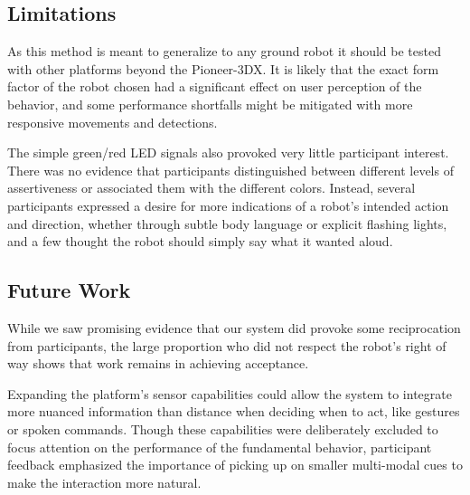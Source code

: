 \documentclass[letterpaper, 10 pt, conference]{ieeeconf}  %
\begin{document}
\subsection{Limitations}

As this method is meant to generalize to any ground robot it should be tested with other platforms beyond the Pioneer-3DX. It is likely that the exact form factor of the robot chosen had a significant effect on user perception of the behavior, and some performance shortfalls might be mitigated with more responsive movements and detections. 

The simple green/red LED signals also provoked very little participant interest. There was no evidence that participants distinguished between different levels of assertiveness or associated them with the different colors. Instead, several participants expressed a desire for more indications of a robot’s intended action and direction, whether through subtle body language or explicit flashing lights, and a few thought the robot should simply say what it wanted aloud. 

\subsection{Future Work}

While we saw promising evidence that our system did provoke some reciprocation from participants, the large proportion who did not respect the robot's right of way shows that work remains in achieving acceptance. 

Expanding the platform’s sensor capabilities could allow the system to integrate more nuanced information than distance when deciding when to act, like gestures or spoken commands. Though these capabilities were deliberately excluded to focus attention on the performance of the fundamental behavior, participant feedback emphasized the importance of picking up on smaller multi-modal cues to make the interaction more natural.

\end{document}
